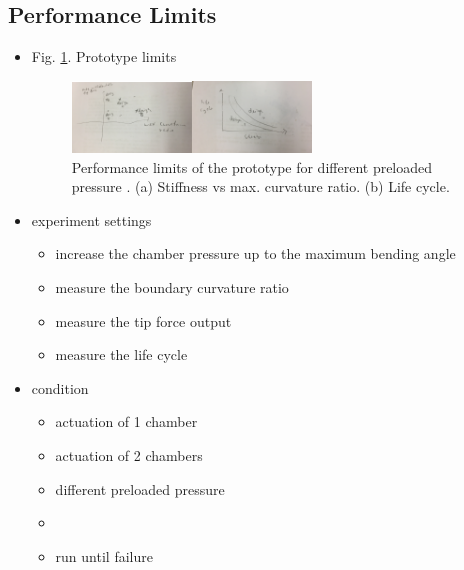 \documentclass[journal,onecolumn]{IEEEtran}
\begin{document}
\subsection{Performance Limits}
\label{sec:org26c3451}
\begin{itemize}
\item Fig. \ref{fig:orgdb518ec}. Prototype limits

\begin{figure}[!h]
\centering
\includegraphics[width=0.6\textwidth]{./fig/fig-limits.png}
\caption{\label{fig:orgdb518ec}
Performance limits of the prototype for different preloaded pressure . (a) Stiffness vs max. curvature ratio. (b) Life cycle.}
\end{figure}

\item experiment settings
\begin{itemize}
\item increase the chamber pressure up to the maximum bending angle
\item measure the boundary curvature ratio
\item measure the tip force output
\item measure the life cycle
\end{itemize}
\item condition
\begin{itemize}
\item actuation of 1 chamber
\item actuation of 2 chambers
\item different preloaded pressure
\item 

\item run until failure
\end{itemize}


\end{itemize}
\end{document}
